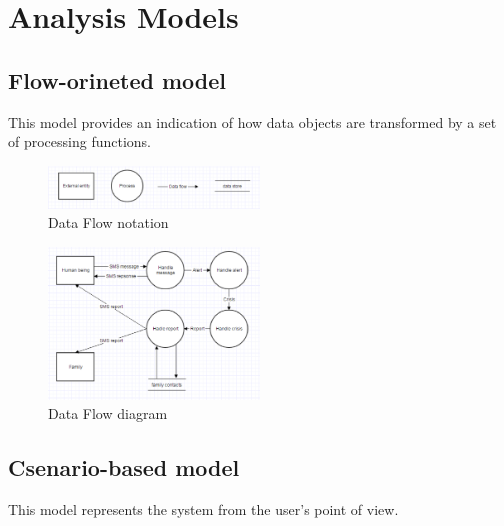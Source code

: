 \chapter{Analysis Models}
\label{chap:AM}



\section{Flow-orineted model}
This model provides an indication of how data objects are transformed by a set
of processing functions.

\begin{figure}[h]
	\centering	
	\captionsetup{justification=centering}
	\includegraphics[width=0.5\textwidth]{./images/flow_notation.eps}
	\caption{Data Flow notation}
\end{figure}


\begin{figure}[h]
	\centering
	\captionsetup{justification=centering}
	\includegraphics[width=0.5\textwidth]{./images/data_flow_diagram.eps}
	\caption{Data Flow diagram}
\end{figure} 

\section{Csenario-based model}
This model represents the system from the user's point of view.

